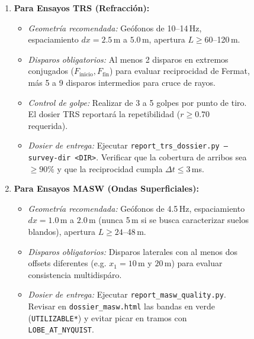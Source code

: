 \documentclass[11pt,a4paper]{article}
\begin{document}
\begin{figure}[h!]
\centering
\small
\begin{tcolorbox}[colback=white,colframe=brandblue,arc=2mm,title=\textbf{Protocolo de Operación en Terreno $\cdot$ Decisión por Técnica}]
\begin{enumerate}
    \item \textbf{Para Ensayos TRS (Refracción):}
    \begin{itemize}
        \item \emph{Geometría recomendada:} Geófonos de 10--14\,Hz, espaciamiento $dx = 2.5$\,m a $5.0$\,m, apertura $L \ge 60$--120\,m.
        \item \emph{Disparos obligatorios:} Al menos 2 disparos en extremos conjugados ($F_{\text{inicio}}, F_{\text{fin}}$) para evaluar reciprocidad de Fermat, más 5 a 9 disparos intermedios para cruce de rayos.
        \item \emph{Control de golpe:} Realizar de 3 a 5 golpes por punto de tiro. El dosier TRS reportará la repetibilidad ($r \ge 0.70$ requerida).
        \item \emph{Dosier de entrega:} Ejecutar \texttt{report\_trs\_dossier.py --survey-dir <DIR>}. Verificar que la cobertura de arribos sea $\ge 90\%$ y que la reciprocidad cumpla $\Delta t \le 3$\,ms.
    \end{itemize}
    \item \textbf{Para Ensayos MASW (Ondas Superficiales):}
    \begin{itemize}
        \item \emph{Geometría recomendada:} Geófonos de 4.5\,Hz, espaciamiento $dx = 1.0$\,m a $2.0$\,m (nunca 5\,m si se busca caracterizar suelos blandos), apertura $L \ge 24$--48\,m.
        \item \emph{Disparos obligatorios:} Disparos laterales con al menos dos offsets diferentes (e.g. $x_1 = 10$\,m y $20$\,m) para evaluar consistencia multidispáro.
        \item \emph{Dosier de entrega:} Ejecutar \texttt{report\_masw\_quality.py}. Revisar en \texttt{dossier\_masw.html} las bandas en verde (\texttt{UTILIZABLE*}) y evitar picar en tramos con \texttt{LOBE\_AT\_NYQUIST}.
    \end{itemize}
\end{enumerate}
\end{tcolorbox}
\end{figure}

\end{document}
